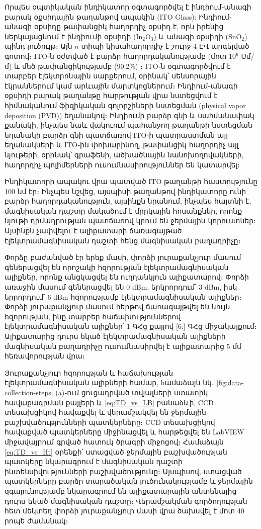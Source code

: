 \documentclass[12pt, fleqn]{report}
\begin{document}
Որպես օպտիկական ինդիկատոր օգտագործվել է ինդիում֊անագի բարակ օքսիդային թաղանթով ապակին (ITO Glass): Ինդիում֊անագի օքսիդը թափանցիկ հաղորդիչ օքսիդ է, որն իրենից ներկայացնում է ինդիումի օքսիդի (In$_2$O$_3$) և անագի օքսիդի (SnO$_2$) պինդ լուծույթ։ Այն $n$ տիպի կիսահաղորդիչ է շուրջ 4 ԷՎ արգելված գոտով։ ITO֊ն օժտված է բարձր հաղորդականությամբ (մոտ 10$^6$ Սմ/մ) և մեծ թափանցիկությամբ (90.2\%) \cite{chen2013itofabcrication}։ ITO֊ն օգտագործվում է տարբեր էլեկտրոնային սարքերում, օրինակ՝ սենսորային էկրաններում կամ արևային մարտկոցներում։ Ինդիում֊անագի օքսիդի բարակ թաղանթը հարթության վրա նստեցվում է հիմնականում ֆիզիկական գոլորշիների նստեցման (physical vapor deposition (PVD)) եղանակով։ Ինդիումի բարձր գնի և սահմանափակ քանակի, ինչպես նաև վակուում պահանջող թաղանթի նստեցման եղանակի բարձր գնի պատճառով ITO֊ի պատրաստման այլ եղանակների և ITO֊ին փոխարինող, թափանցիկ հաղորդիչ այլ նյութերի, օրինակ՝ գրաֆենի, ածխածնային նանոխողովակների, հաղորդիչ պոլիմերների ուսումնասիրություններ են կատարվել։

Ինդիկատորի ապակու վրա պատված ITO թաղանթի հաստությունը 100 նմ էր։  Ինչպես նշվեց, այսպիսի թաղանթով ինդիկատորը ունի բարձր հաղորդականություն, այսինքն նրանում, ինչպես հայտնի է, մագնիսական դաշտը մակածում է մրրկային հոսանքներ, որոնք նյութի դիմադրության պատճառով կրում են ջերմային կորուստներ։ Այսինքն չափվելու է ալիքատարի ճառագայթած  էլեկտրամագնիսական դաշտի հենց մագնիսական բաղադրիչը։

Փորձը բաժանված էր երեք մասի, փորձի յուրաքանչյուր մասում գեներացվել են որոշակի հզորության էլեկտրամագնիսական ալիքներ, որոնք անցկացվել են ուղղանկյուն ալիքատարով։ Փորձի առաջին մասում գեներացվել են 0 dBm, երկրորդում՝ 3 dBm, իսկ երրորդում՝ 6 dBm հզորությամբ էլեկտրամագնիսական ալիքներ։ Փորձի յուրաքանչյուր մասում հերթով ճառագայթվել են նույն հզորության, ինը տարբեր հաճախություններով էլեկտրամագնիսական ալիքներ՝ 1 ԳՀց քայլով [6;] ԳՀց միջակայքում։ Ալիքատարից դուրս եկած էլեկտրամագնիսական ալիքների մագնիսական բաղադրիչը ուսումնասիրվել է ալիքատարից 5 մմ հեռավորության վրա։

Յուրաքանչյուր հզորության և հաճախության էլեկտրամագնիսական ալիքների համար, hամաձայն նկ․ \ref{fig:data-collection-steps} (a)֊ում ցուցադրված տվյալների ստատիկ հավաքագրման քայլերի և \eqref{eq:TD_vs_LB} բանաձևի, CCD տեսախցիկով հավաքվել և վերամշակվել են ջերմային բաշխվածությունների պատկերները։ CCD տեսախցիկով հավաքված պատկերները միջինացվել և հարթեցվել են LabVIEW միջավայրում գրված հատուկ ծրագրի միջոցով։ Համաձայն \eqref{eq:TD_vs_Ht} օրենքի՝ ստացված ջերմային բաշխվածության պատկերը նկարագրում է մագնիսական դաշտի ինտենսիվությունների բաշխվածությունը։ Այսպիսով, ստացված պատկերները բարձր տարածական լուծունակությամբ և ջերմային զգայունությամբ նկարագրում են ալիքատարային անտենայից դուրս եկած մագնիսական դաշտը։ Վերամշակման գործողության հետ մեկտեղ փորձի յուրաքանչյուր մասի վրա ծախսվել է մոտ 40 րոպե ժամանակ։
\end{document}
